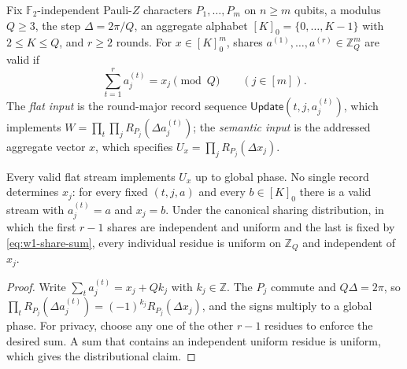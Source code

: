 \begin{definition}
\label{def:w1-dispersed-stream}
Fix $\mathbb F_2$-independent Pauli-$Z$ characters $P_1,\ldots,P_m$ on
$n\geq m$ qubits, a modulus $Q\geq3$, the step $\Delta=2\pi/Q$, an
aggregate alphabet $[K]_0=\{0,\ldots,K-1\}$ with $2\leq K\leq Q$, and
$r\geq2$ rounds.  For $x\in[K]_0^m$, shares
$a^{(1)},\ldots,a^{(r)}\in\mathbb Z_Q^m$ are valid if
\begin{equation}
 \sum_{t=1}^r a_j^{(t)}=x_j\pmod Q
 \qquad(j\in[m]).
 \label{eq:w1-share-sum}
\end{equation}
The \emph{flat input} is the round-major record sequence
$\mathsf{Update}(t,j,a_j^{(t)})$, which implements
$W=\prod_{t}\prod_{j}R_{P_j}(\Delta a_j^{(t)})$; the \emph{semantic
input} is the addressed aggregate vector $x$, which specifies
$U_x=\prod_jR_{P_j}(\Delta x_j)$.
\end{definition}

\begin{proposition}
\label{prop:w1-stream-equivalence}
\label{prop:family-aggregates}
Every valid flat stream implements $U_x$ up to global phase.  No single
record determines $x_j$: for every fixed $(t,j,a)$ and every $b\in[K]_0$
there is a valid stream with $a_j^{(t)}=a$ and $x_j=b$.  Under the
canonical sharing distribution, in which the first $r-1$ shares are
independent and uniform and the last is fixed by
\eqref{eq:w1-share-sum}, every individual residue is uniform on
$\mathbb Z_Q$ and independent of $x_j$.
\end{proposition}

\begin{proof}
Write $\sum_ta_j^{(t)}=x_j+Qk_j$ with $k_j\in\mathbb Z$.  The $P_j$
commute and $Q\Delta=2\pi$, so
$\prod_tR_{P_j}(\Delta a_j^{(t)})=(-1)^{k_j}R_{P_j}(\Delta x_j)$, and the
signs multiply to a global phase.  For privacy, choose any one of the other
$r-1$ residues to enforce the desired sum.  A sum that contains an
independent uniform residue is uniform, which gives the distributional
claim.
\end{proof}

